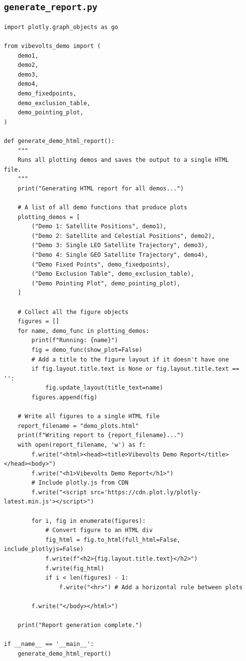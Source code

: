 \documentclass[11pt]{article}
\begin{document}
\subsection{\texttt{generate\_report.py}}
\begin{Verbatim}
import plotly.graph_objects as go

from vibevolts_demo import (
    demo1,
    demo2,
    demo3,
    demo4,
    demo_fixedpoints,
    demo_exclusion_table,
    demo_pointing_plot,
)

def generate_demo_html_report():
    """
    Runs all plotting demos and saves the output to a single HTML file.
    """
    print("Generating HTML report for all demos...")

    # A list of all demo functions that produce plots
    plotting_demos = [
        ("Demo 1: Satellite Positions", demo1),
        ("Demo 2: Satellite and Celestial Positions", demo2),
        ("Demo 3: Single LEO Satellite Trajectory", demo3),
        ("Demo 4: Single GEO Satellite Trajectory", demo4),
        ("Demo Fixed Points", demo_fixedpoints),
        ("Demo Exclusion Table", demo_exclusion_table),
        ("Demo Pointing Plot", demo_pointing_plot),
    ]

    # Collect all the figure objects
    figures = []
    for name, demo_func in plotting_demos:
        print(f"Running: {name}")
        fig = demo_func(show_plot=False)
        # Add a title to the figure layout if it doesn't have one
        if fig.layout.title.text is None or fig.layout.title.text == '':
            fig.update_layout(title_text=name)
        figures.append(fig)

    # Write all figures to a single HTML file
    report_filename = "demo_plots.html"
    print(f"Writing report to {report_filename}...")
    with open(report_filename, 'w') as f:
        f.write("<html><head><title>Vibevolts Demo Report</title></head><body>")
        f.write("<h1>Vibevolts Demo Report</h1>")
        # Include plotly.js from CDN
        f.write("<script src='https://cdn.plot.ly/plotly-latest.min.js'></script>")

        for i, fig in enumerate(figures):
            # Convert figure to an HTML div
            fig_html = fig.to_html(full_html=False, include_plotlyjs=False)
            f.write(f"<h2>{fig.layout.title.text}</h2>")
            f.write(fig_html)
            if i < len(figures) - 1:
                f.write("<hr>") # Add a horizontal rule between plots

        f.write("</body></html>")

    print("Report generation complete.")

if __name__ == '__main__':
    generate_demo_html_report()
\end{Verbatim}
\end{document}
